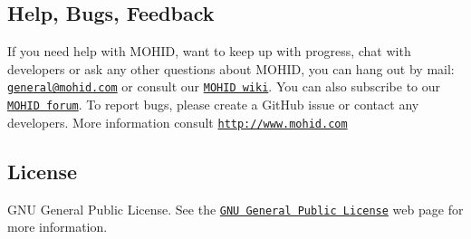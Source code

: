 \subsection*{Help, Bugs, Feedback}

If you need help with M\+O\+H\+ID, want to keep up with progress, chat with developers or ask any other questions about M\+O\+H\+ID, you can hang out by mail\+: \href{mailto:general@mohid.com}{\tt general@mohid.\+com} or consult our \href{http://wiki.mohid.com}{\tt M\+O\+H\+ID wiki}. You can also subscribe to our \href{http://forum.mohid.com}{\tt M\+O\+H\+ID forum}. To report bugs, please create a Git\+Hub issue or contact any developers. More information consult \href{http://www.mohid.com}{\tt http\+://www.\+mohid.\+com}

\subsection*{License}

G\+NU General Public License. See the \href{http://www.gnu.org/copyleft/gpl.html}{\tt G\+NU General Public License} web page for more information. 
